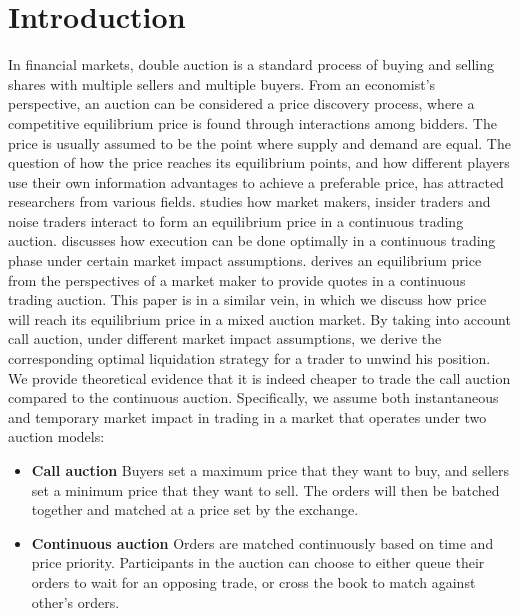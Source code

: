\documentclass{article}
\begin{document}
\section{Introduction}
In financial markets, double auction is a standard process of buying and selling shares with multiple sellers and multiple buyers. From an economist's perspective, an auction can be considered a price discovery process, where a competitive equilibrium price is found through interactions among bidders. The price is usually assumed to be the point where supply and demand are equal. The question of how the price reaches its equilibrium points, and how different players use their own information advantages to achieve a preferable price, has attracted researchers from various fields. \cite{Kyle1985} studies how market makers, insider traders and noise traders interact to form an equilibrium price in a continuous trading auction. \cite{AlmgrenChriss2000} discusses how execution can be done optimally in a continuous trading phase under certain market impact assumptions. \cite{Avellaneda2008} derives an equilibrium price from the perspectives of a market maker to provide quotes in a continuous trading auction. This paper is in a similar vein, in which we discuss how price will reach its equilibrium price in a mixed auction market. By taking into account call auction, under different market impact assumptions, we derive the corresponding optimal liquidation strategy for a trader to unwind his position. We provide theoretical evidence that it is indeed cheaper to trade the call auction compared to the continuous auction. Specifically, we assume both instantaneous and temporary market impact in trading in a market that operates under two auction models:
\begin{itemize}
\item \textbf{Call auction} Buyers set a maximum price that they want to buy, and sellers set a minimum price that they want to sell. The orders will then be batched together and matched at a price set by the exchange.
\item \textbf{Continuous auction} Orders are matched continuously based on time and price priority. Participants in the auction can choose to either queue their orders to wait for an opposing trade, or cross the book to match against other's orders.
\end{itemize}
\end{document}
